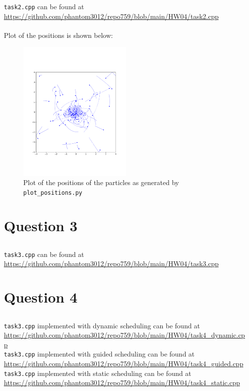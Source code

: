 \documentclass[12pt]{article}
\begin{document}
\subsection{}
\texttt{task2.cpp} can be found at \url{https://github.com/phantom3012/repo759/blob/main/HW04/task2.cpp} \\ \\
Plot of the positions is shown below:
\begin{figure}[ht]
    \centering
    \includegraphics[width=0.5\textwidth]{nbody-cpp.png}
    \caption{Plot of the positions of the particles as generated by \texttt{plot\_positions.py}}
\end{figure}
\newpage
\section{Question 3}
\subsection{}
\texttt{task3.cpp} can be found at \url{https://github.com/phantom3012/repo759/blob/main/HW04/task3.cpp}

\section{Question 4}
\subsection{}
\texttt{task3.cpp} implemented with dynamic scheduling can be found at \url{https://github.com/phantom3012/repo759/blob/main/HW04/task4_dynamic.cpp} \\
\texttt{task3.cpp} implemented with guided scheduling can be found at \url{https://github.com/phantom3012/repo759/blob/main/HW04/task4_guided.cpp} \\
\texttt{task3.cpp} implemented with static scheduling can be found at \url{https://github.com/phantom3012/repo759/blob/main/HW04/task4_static.cpp} \\
\end{document}
